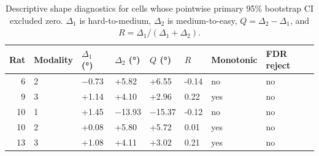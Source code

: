 \begin{table}[htbp]
  \centering
  \caption{Descriptive shape diagnostics for cells whose pointwise primary 95\% bootstrap CI excluded zero. $\Delta_1$ is hard-to-medium, $\Delta_2$ is medium-to-easy, $Q=\Delta_2-\Delta_1$, and $R=\Delta_1/(\Delta_1+\Delta_2)$.}
  \label{tab:perceptual_bias_shape_diagnostics}
  \begin{tabular}{rlllllll}
    \toprule
    Rat & Modality & $\Delta_1$ (°) & $\Delta_2$ (°) & $Q$ (°) & $R$ & Monotonic & FDR reject \\
    \midrule
    6 & 2 & −0.73 & +5.82 & +6.55 & -0.14 & no & no \\
    9 & 3 & +1.14 & +4.10 & +2.96 & 0.22 & yes & no \\
    10 & 1 & +1.45 & −13.93 & −15.37 & -0.12 & no & no \\
    10 & 2 & +0.08 & +5.80 & +5.72 & 0.01 & yes & no \\
    13 & 3 & +1.08 & +4.11 & +3.02 & 0.21 & yes & no \\
    \bottomrule
  \end{tabular}
\end{table}
